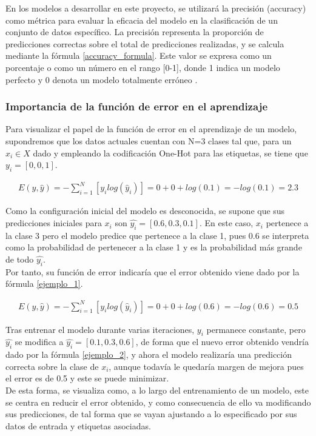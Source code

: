 En los modelos a desarrollar en este proyecto, se utilizará la precisión (accuracy) como métrica para evaluar la eficacia del modelo en la clasificación de un conjunto de datos específico. La precisión representa la proporción de predicciones correctas sobre el total de predicciones realizadas, y se calcula mediante la fórmula \ref{accuracy_formula}. Este valor se expresa como un porcentaje o como un número en el rango [0-1], donde 1 indica un modelo perfecto y 0 denota un modelo totalmente erróneo \cite{accuracy}. 

\subsubsection{Importancia de la función de error en el aprendizaje}

Para visualizar el papel de la función de error en el aprendizaje de un modelo, supondremos que los datos actuales cuentan con N=3 clases tal que, para un $x_i \in X$ dado y empleando la codificación One-Hot para las etiquetas, se tiene que $y_i = [0, 0, 1]$. 

\begin{gather}
	E(y, \hat{y}) = - \sum_{i=1}^{N}  [y_i log( \hat{y}_i)] = 0 + 0 + log(0.1) = -log(0.1) = 2.3
	\label{ejemplo_1}
\end{gather}

Como la configuración inicial del modelo es desconocida, se supone que sus predicciones iniciales para $x_i$ son $\hat{y_i} = [ 0.6, 0.3, 0.1]$. En este caso, $x_i$ pertenece a la clase 3 pero el modelo predice que pertenece a la clase 1, pues 0.6 se interpreta como la probabilidad de pertenecer a la clase 1 y es la probabilidad más grande de todo $\hat{y_i}$.\\
Por tanto, su función de error indicaría que el error obtenido viene dado por la fórmula \ref{ejemplo_1}.

\begin{gather}
	E(y, \hat{y}) = - \sum_{i=1}^{N}  [y_i log( \hat{y}_i)] = 0 + 0 + log(0.6) = -log(0.6) = 0.5
	\label{ejemplo_2}
\end{gather}

Tras entrenar el modelo durante varias iteraciones, $y_i$ permanece constante, pero $\hat{y_i}$ se modifica a $\hat{y_i} = [0.1, 0.3, 0.6]$, de forma que el nuevo error obtenido vendría dado por la fórmula \ref{ejemplo_2}, y ahora el modelo realizaría una predicción correcta sobre la clase de $x_i$, aunque todavía le quedaría margen de mejora pues el error es de 0.5 y este se puede minimizar. \\
De esta forma, se visualiza como, a lo largo del entrenamiento de un modelo, este se centra en reducir el error obtenido, y como consecuencia de ello va modificando sus predicciones, de tal forma que se vayan ajustando a lo especificado por sus datos de entrada y etiquetas asociadas.


